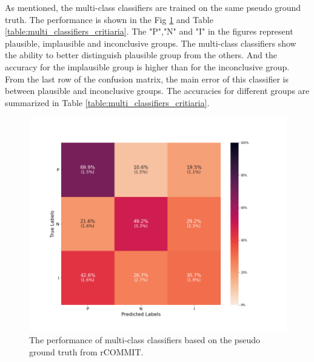As mentioned, the multi-class classifiers are trained on the same pseudo ground truth.
The performance is shown in the Fig \ref{fig:rcommit_multi_classifiers} and Table \ref{table:multi_classifiers_critiaria}.
The "P","N" and "I" in the figures represent plausible, implausible and inconclusive groups.
The multi-class classifiers show the ability to better distinguish plausible group from the others.
And the accuracy for the implausible group is higher than for the inconclusive group. 
From the last row of the confusion matrix, the main error of this classifier is between plausible and inconclusive groups.
The accuracies for different groups are summarized in Table \ref{table:multi_classifiers_critiaria}.

\begin{figure}[ht]
    \centering
    \includegraphics[width= 12cm]{figures/multi_class.png}
    \caption{The performance of multi-class classifiers based on the pseudo ground truth from rCOMMIT.
    }
\label{fig:rcommit_multi_classifiers}
\end{figure}



